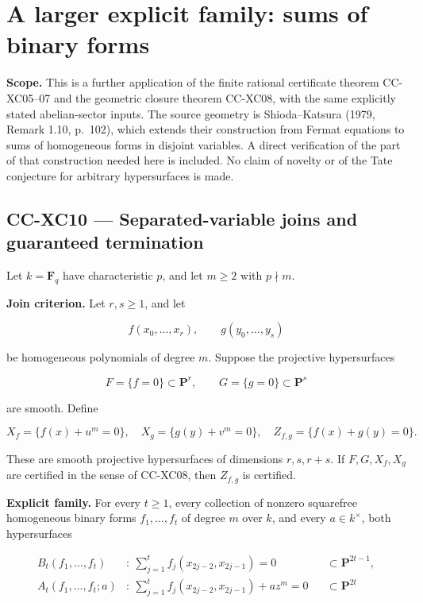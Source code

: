 \section{A larger explicit family: sums of binary
forms}\label{a-larger-explicit-family-sums-of-binary-forms}

\textbf{Scope.} This is a further application of the finite rational
certificate theorem CC-XC05--07 and the geometric closure theorem
CC-XC08, with the same explicitly stated abelian-sector inputs. The
source geometry is Shioda--Katsura (1979, Remark 1.10, p.~102), which
extends their construction from Fermat equations to sums of homogeneous
forms in disjoint variables. A direct verification of the part of that
construction needed here is included. No claim of novelty or of the Tate
conjecture for arbitrary hypersurfaces is made.

\subsection{CC-XC10 --- Separated-variable joins and guaranteed
termination}\label{cc-xc10-separated-variable-joins-and-guaranteed-termination}

Let \(k=\mathbf F_q\) have characteristic \(p\), and let \(m\ge2\) with
\(p\nmid m\).

\textbf{Join criterion.} Let \(r,s\ge1\), and let

\[
 f(x_0,\ldots,x_r),\qquad g(y_0,\ldots,y_s)
\]

be homogeneous polynomials of degree \(m\). Suppose the projective
hypersurfaces

\[
 F=\{f=0\}\subset\mathbf P^r,\qquad
 G=\{g=0\}\subset\mathbf P^s
\]

are smooth. Define

\[
 X_f=\{f(x)+u^m=0\},\quad
 X_g=\{g(y)+v^m=0\},\quad
 Z_{f,g}=\{f(x)+g(y)=0\}.
 \tag{CC-XC.24}
\]

These are smooth projective hypersurfaces of dimensions \(r,s,r+s\). If
\(F,G,X_f,X_g\) are certified in the sense of CC-XC08, then \(Z_{f,g}\)
is certified.

\textbf{Explicit family.} For every \(t\ge1\), every collection of
nonzero squarefree homogeneous binary forms \(f_1,\ldots,f_t\) of degree
\(m\) over \(k\), and every \(a\in k^\times\), both hypersurfaces

\[
 \begin{aligned}
 B_t(f_1,\ldots,f_t)
   &:\ \sum_{j=1}^t f_j(x_{2j-2},x_{2j-1})=0
       &&\subset\mathbf P^{2t-1},\\
 A_t(f_1,\ldots,f_t;a)
   &:\ \sum_{j=1}^t f_j(x_{2j-2},x_{2j-1})+a z^m=0
       &&\subset\mathbf P^{2t}
 \end{aligned}
 \tag{CC-XC.25}
\]

